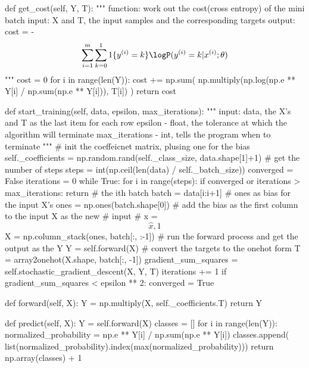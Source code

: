 \documentclass[a4paper]{article}
\begin{document}
\begin{python}
    def get_cost(self, Y, T):
        """
        function:
            work out the cost(cross entropy) of the mini batch
        input:
            X and T, the input samples and the corresponding targets
        output:
            cost = - \[\sum_{i=1}^m\sum_{k=0}^1 1\{y^{(i)}=k\}
            \logP(y^{(i)}=k|x^{(i)}; \theta)\]
        """
        cost = 0
        for i in range(len(Y)):
            cost += np.sum(
                np.multiply(np.log(np.e ** Y[i] / np.sum(np.e ** Y[i])), T[i])
            )
        return cost

    def start_training(self, data, epsilon, max_iterations):
        """
        input:
            data, the X's and T as the last item for each row
            epsilon - float, the tolerance at which the algorithm will terminate
            max_iterations - int, tells the program when to terminate
        """
        # init the coeffeicnet matrix, plusing one for the bias
        self._coefficients = np.random.rand(self._class_size, data.shape[1]+1)
        # get the number of steps
        steps = int(np.ceil(len(data) / self._batch_size))
        converged = False
        iterations = 0
        while True:
            for i in range(steps):
                if converged or iterations > max_iterations:
                    return
                # the ith batch
                batch = data[i:i+1]
                # ones as bias for the input X's
                ones = np.ones(batch.shape[0])
                # add the bias as the first column to the input X as the new
                # input
                # x = \[\hat x, 1\]
                X = np.column_stack(ones, batch[:, :-1])
                # run the forward process and get the output as the Y
                Y = self.forward(X)
                # convert the targets to the onehot form
                T = array2onehot(X.shape, batch[:, -1])
                gradient_sum_squares = self.stochastic_gradient_descent(X, Y, T)
                iterations += 1
                if gradient_sum_squares < epsilon ** 2:
                    converged = True

    def forward(self, X):
        Y = np.multiply(X, self._coefficients.T)
        return Y

    def predict(self, X):
        Y = self.forward(X)
        classes = []
        for i in range(len(Y)):
            normalized_probability = np.e ** Y[i] / np.sum(np.e ** Y[i])
            classes.append(
                list(normalized_probability).index(max(normalized_probability)))
        return np.array(classes) + 1
\end{python}
\end{document}
